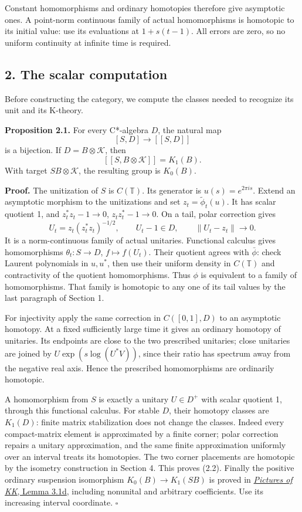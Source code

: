 \documentclass[
  11pt,
]{article}
\begin{document}
Constant homomorphisms and ordinary homotopies therefore give asymptotic
ones. A point-norm continuous family of actual homomorphisms is
homotopic to its initial value: use its evaluations at \(1+s(t-1)\). All
errors are zero, so no uniform continuity at infinite time is required.

\subsection{2. The scalar computation}\label{the-scalar-computation}

Before constructing the category, we compute the classes needed to
recognize its unit and its K-theory.

\textbf{Proposition 2.1.} For every C*-algebra \(D\), the natural map \[
[S,D]\longrightarrow[[S,D]]
\tag{2.1}
\] is a bijection. If \(D=B\otimes\mathcal K\), then \[
[[S,B\otimes\mathcal K]]=K_1(B).
\tag{2.2}
\] With target \(SB\otimes\mathcal K\), the resulting group is
\(K_0(B)\).

\textbf{Proof.} The unitization of \(S\) is \(C(\mathbb T)\). Its
generator is \(u(s)=e^{2\pi is}\). Extend an asymptotic morphism to the
unitizations and set \(z_t=\widetilde\phi_t(u)\). It has scalar quotient
1, and \(z_t^*z_t-1\to0\), \(z_tz_t^*-1\to0\). On a tail, polar
correction gives \[
U_t=z_t(z_t^*z_t)^{-1/2},\qquad U_t-1\in D,
\qquad\|U_t-z_t\|\to0.
\tag{2.3}
\] It is a norm-continuous family of actual unitaries. Functional
calculus gives homomorphisms \(\theta_t:S\to D\), \(f\mapsto f(U_t)\).
Their quotient agrees with \(\bar\phi\): check Laurent polynomials in
\(u,u^*\), then use their uniform density in \(C(\mathbb T)\) and
contractivity of the quotient homomorphisms. Thus \(\phi\) is equivalent
to a family of homomorphisms. That family is homotopic to any one of its
tail values by the last paragraph of Section 1.

For injectivity apply the same correction in \(C([0,1],D)\) to an
asymptotic homotopy. At a fixed sufficiently large time it gives an
ordinary homotopy of unitaries. Its endpoints are close to the two
prescribed unitaries; close unitaries are joined by
\(U\exp(s\log(U^*V))\), since their ratio has spectrum away from the
negative real axis. Hence the prescribed homomorphisms are ordinarily
homotopic.

A homomorphism from \(S\) is exactly a unitary \(U\in D^+\) with scalar
quotient 1, through this functional calculus. For stable \(D\), their
homotopy classes are \(K_1(D)\): finite matrix stabilization does not
change the classes. Indeed every compact-matrix element is approximated
by a finite corner; polar correction repairs a unitary approximation,
and the same finite approximation uniformly over an interval treats its
homotopies. The two corner placements are homotopic by the isometry
construction in Section 4. This proves (2.2). Finally the positive
ordinary suspension isomorphism \(K_0(B)\to K_1(SB)\) is proved in
\href{KT-KK-07.html\#projection-lifts-and-the-exponential-boundary}{\emph{Pictures
of KK}, Lemma 3.1d}, including nonunital and arbitrary coefficients. Use
its increasing interval coordinate. \(\square\)
\end{document}
